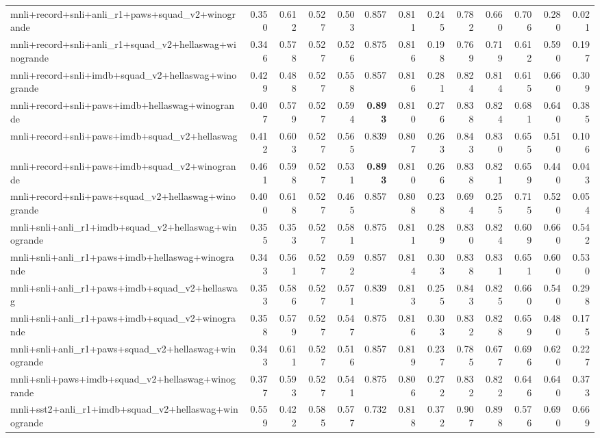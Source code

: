 \begin{table}[t]
\begin{tabular}{lrrrrrrrrrrrr}
    mnli+record+snli+anli\_r1+paws+squad\_v2+winogrande & 0.350 & 0.612 & 0.527 & 0.503 & 0.857 & 0.811 & 0.245 & 0.782 & 0.660 & 0.706 & 0.280 & 0.021 \\
    mnli+record+snli+anli\_r1+squad\_v2+hellaswag+winogrande & 0.346 & 0.578 & 0.527 & 0.526 & 0.875 & 0.816 & 0.198 & 0.769 & 0.719 & 0.612 & 0.590 & 0.197 \\
    mnli+record+snli+imdb+squad\_v2+hellaswag+winogrande & 0.429 & 0.488 & 0.527 & 0.558 & 0.857 & 0.816 & 0.281 & 0.824 & 0.814 & 0.615 & 0.660 & 0.309 \\
    mnli+record+snli+paws+imdb+hellaswag+winogrande & 0.407 & 0.579 & 0.527 & 0.594 & \textbf{0.893} & 0.810 & 0.276 & 0.838 & 0.824 & 0.681 & 0.640 & 0.385 \\
    mnli+record+snli+paws+imdb+squad\_v2+hellaswag & 0.412 & 0.603 & 0.527 & 0.565 & 0.839 & 0.807 & 0.263 & 0.843 & 0.830 & 0.655 & 0.510 & 0.106 \\
    mnli+record+snli+paws+imdb+squad\_v2+winogrande & 0.461 & 0.598 & 0.527 & 0.531 & \textbf{0.893} & 0.810 & 0.266 & 0.838 & 0.821 & 0.659 & 0.440 & 0.043 \\
    mnli+record+snli+paws+squad\_v2+hellaswag+winogrande & 0.400 & 0.618 & 0.527 & 0.465 & 0.857 & 0.808 & 0.238 & 0.694 & 0.255 & 0.715 & 0.520 & 0.054 \\
    mnli+snli+anli\_r1+imdb+squad\_v2+hellaswag+winogrande & 0.355 & 0.353 & 0.527 & 0.581 & 0.875 & 0.811 & 0.289 & 0.830 & 0.824 & 0.609 & 0.660 & 0.542 \\
    mnli+snli+anli\_r1+paws+imdb+hellaswag+winogrande & 0.343 & 0.561 & 0.527 & 0.592 & 0.857 & 0.814 & 0.303 & 0.838 & 0.831 & 0.651 & 0.600 & 0.530 \\
    mnli+snli+anli\_r1+paws+imdb+squad\_v2+hellaswag & 0.353 & 0.586 & 0.527 & 0.571 & 0.839 & 0.813 & 0.255 & 0.843 & 0.825 & 0.660 & 0.540 & 0.298 \\
    mnli+snli+anli\_r1+paws+imdb+squad\_v2+winogrande & 0.358 & 0.579 & 0.527 & 0.547 & 0.875 & 0.816 & 0.303 & 0.832 & 0.828 & 0.659 & 0.480 & 0.175 \\
    mnli+snli+anli\_r1+paws+squad\_v2+hellaswag+winogrande & 0.343 & 0.611 & 0.527 & 0.516 & 0.857 & 0.819 & 0.237 & 0.785 & 0.677 & 0.696 & 0.620 & 0.227 \\
    mnli+snli+paws+imdb+squad\_v2+hellaswag+winogrande & 0.377 & 0.593 & 0.527 & 0.541 & 0.875 & 0.806 & 0.272 & 0.832 & 0.822 & 0.646 & 0.640 & 0.373 \\
    mnli+sst2+anli\_r1+imdb+squad\_v2+hellaswag+winogrande & 0.559 & 0.422 & 0.585 & 0.577 & 0.732 & 0.818 & 0.372 & 0.907 & 0.898 & 0.576 & 0.690 & 0.669 \\

\end{tabular}
\end{table}
